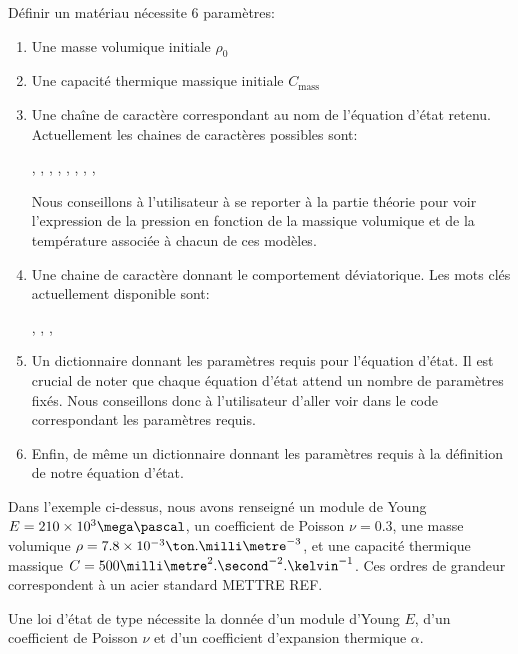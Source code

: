\documentclass[10pt]{book}
\begin{document}
\begin{figure}[h!]

\end{figure}
Définir un matériau nécessite 6 paramètres:
\begin{enumerate}
\item Une masse volumique initiale $\rho_{0}$
\item Une capacité thermique massique initiale $C_{\mathrm{mass}}$
\item Une chaîne de caractère correspondant au nom de l'équation d'état retenu. Actuellement les chaines de caractères possibles sont:
\begin{center}
, , , , , , , , 
\end{center}
Nous conseillons à l'utilisateur à se reporter à la partie théorie pour voir l'expression de la pression en fonction de la massique volumique et de la température associée à chacun de ces modèles.
\item Une chaine de caractère donnant le comportement déviatorique. Les mots clés actuellement disponible sont:
\begin{center}
, , , 
\end{center}
\item Un dictionnaire donnant les paramètres requis pour l'équation d'état. Il est crucial de noter que chaque équation d'état attend un nombre de paramètres fixés. Nous conseillons donc à l'utilisateur d'aller voir dans le code correspondant les paramètres requis.
\item Enfin, de même un dictionnaire donnant les paramètres requis à la définition de notre équation d'état.
\end{enumerate}
Dans l'exemple ci-dessus, nous avons renseigné un module de Young $E=210 \times 10^3 \mega\pascal$, un coefficient de Poisson $\nu=0.3$, une masse volumique $\rho = 7.8 \times 10^{-3} \ton.\milli\metre^{-3}$, et une capacité thermique massique $C=500 \milli\metre^{2}.\second^{-2}.\kelvin^{-1}$. Ces ordres de grandeur correspondent à un acier standard METTRE REF.

Une loi d'état de type  nécessite la donnée d'un module d'Young $E$, d'un coefficient de Poisson $\nu$ et d'un coefficient d'expansion thermique $\alpha$.
\end{document}
